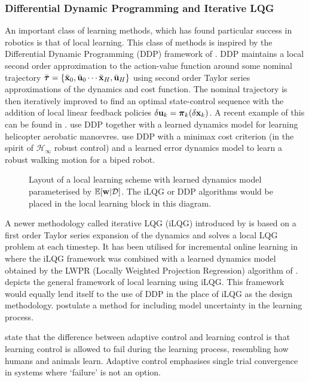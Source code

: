 \subsubsection{Differential Dynamic Programming and Iterative LQG}
An important class of learning methods, which has found particular success in robotics is that of local learning. This class of methods is inspired by the Differential Dynamic Programming (DDP) framework of \cite{JaMa70}. DDP maintains a local second order approximation to the action-value function around some nominal trajectory $\bar{\boldsymbol{\tau}}=\{\bar{\mathbf{x}}_0, \bar{\mathbf{u}}_0 \cdots \bar{\mathbf{x}}_H, \bar{\mathbf{u}}_H\}$ using second order Taylor series approximations of the dynamics and cost function. The nominal trajectory is then iteratively improved to find an optimal state-control sequence with the addition of local linear feedback policies $\delta\mathbf{u}_k = \boldsymbol{\pi}_k(\delta\mathbf{x}_k)$. A recent example of this can be found in \cite{TT09}. \cite{ACQN07} use DDP together with a learned dynamics model for learning helicopter aerobatic man{\oe}vres. \cite{MZA02} use DDP with a minimax cost criterion (in the spirit of $\mathcal{H}_\infty$ robust control) and a learned error dynamics model to learn a robust walking motion for a biped robot.



\begin{figure}
\centering

\caption{Layout of a local learning scheme with learned dynamics model parameterised by $\mathbb{E}[\mathbf{w}|\mathcal{D}]$. The iLQG or DDP algorithms would be placed in the local learning block in this diagram.}
\label{fig:iLQGLD}
\end{figure}

A newer methodology called iterative LQG (iLQG) introduced by \cite{TL05} is based on a first order Taylor series expansion of the dynamics and solves a local LQG problem at each timestep. It has been utilised for incremental online learning in \cite{MKV10} where the iLQG framework was combined with a learned dynamics model obtained by the LWPR (Locally Weighted Projection Regression) algorithm of \cite{VDS05}.  depicts the general framework of local learning using iLQG. This framework would equally lend itself to the use of DDP in the place of iLQG as the design methodology. \cite{MKOKV10} postulate a method for including model uncertainty in the learning process.



\cite{TVS10} state that the difference between adaptive control and learning control is that learning control is allowed to fail during the learning process, resembling how humans and animals learn. Adaptive control emphasises single trial convergence in systems where `failure' is not an option.


